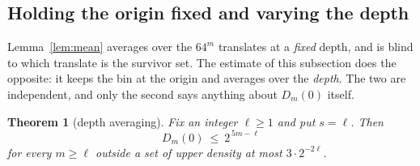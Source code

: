 \documentclass[11pt,a4paper]{article}
\theoremstyle{plain}
\newtheorem{theorem}{Theorem}[section]
\theoremstyle{definition}
\theoremstyle{remark}
\begin{document}
\subsection{Holding the origin fixed and varying the depth}

Lemma~\ref{lem:mean} averages over the $64^m$ translates at a \emph{fixed}
depth, and is blind to which translate is the survivor set. The estimate of
this subsection does the opposite: it keeps the bin at the origin and averages
over the \emph{depth}. The two are independent, and only the second says
anything about $D_m(0)$ itself.

\begin{theorem}[depth averaging]\label{thm:depthavg}
Fix an integer $\ell\ge1$ and put $s=\ell$. Then
\[
D_m(0)\ \le\ 2^{\,5m-\ell}
\]
for every $m\ge\ell$ outside a set of upper density at most $3\cdot2^{-2\ell}$.
\end{theorem}
\end{document}
